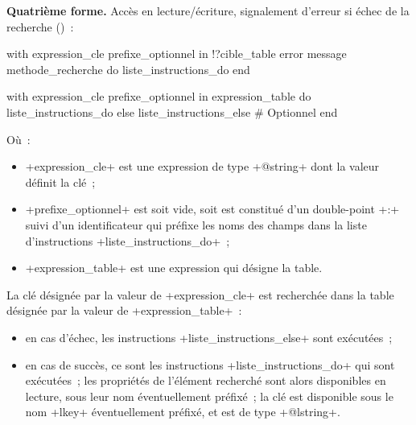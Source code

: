 \textbf{Quatrième forme.} Accès en lecture/écriture, signalement d'erreur si échec de la recherche ()~:
\begin{galgas}
with expression_cle prefixe_optionnel in !?cible_table
error message methode_recherche
do
  liste_instructions_do
end
\end{galgas}






\begin{galgas}
with expression_cle prefixe_optionnel in expression_table
do
  liste_instructions_do
else
  liste_instructions_else # Optionnel
end
\end{galgas}

Où~:
\begin{itemize}
  \item \ggs+expression_cle+ est une expression de type \ggs+@string+ dont la valeur définit la clé~;
  \item \ggs+prefixe_optionnel+ est soit vide, soit est constitué d'un double-point \ggs+:+ suivi d'un identificateur qui préfixe les noms des champs dans la liste d'instructions \ggs+liste_instructions_do+~;
  \item \ggs+expression_table+ est une expression qui désigne la table.
\end{itemize}

La clé désignée par la valeur de \ggs+expression_cle+ est recherchée dans la table désignée par la valeur de \ggs+expression_table+~:
\begin{itemize}
  \item en cas d'échec, les instructions \ggs+liste_instructions_else+ sont exécutées~;
  \item en cas de succès, ce sont les instructions \ggs+liste_instructions_do+ qui sont exécutées~; les propriétés de l'élément recherché sont alors disponibles en lecture, sous leur nom éventuellement préfixé~; la clé est disponible sous le nom \ggs+lkey+ éventuellement préfixé, et est de type \ggs+@lstring+.
\end{itemize}

%
%


